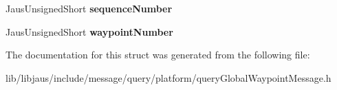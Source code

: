 \begin{DoxyCompactItemize}
\item 
\hypertarget{struct_query_global_waypoint_message_struct_a5f232651b125281ad51247106b3da556}{\-Jaus\-Unsigned\-Short {\bfseries sequence\-Number}}\label{struct_query_global_waypoint_message_struct_a5f232651b125281ad51247106b3da556}

\item 
\hypertarget{struct_query_global_waypoint_message_struct_a329b63a6164375f87313a5e467e950a6}{\-Jaus\-Unsigned\-Short {\bfseries waypoint\-Number}}\label{struct_query_global_waypoint_message_struct_a329b63a6164375f87313a5e467e950a6}

\end{DoxyCompactItemize}


\-The documentation for this struct was generated from the following file\-:\begin{DoxyCompactItemize}
\item 
lib/libjaus/include/message/query/platform/query\-Global\-Waypoint\-Message.\-h\end{DoxyCompactItemize}

